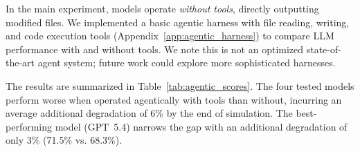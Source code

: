 \documentclass{article} %
\begin{document}
\begin{table}[t]
\vspace{-2\intextsep}
\begin{minipage}[t]{0.48\textwidth}
\vspace{0pt}
\centering

\caption{Tool-use effect on degradation for four LLMs, comparing agentic (\iconagentic) and direct (\icondirect) operation. All models degrade documents more with tools than without.}
\label{tab:agentic_scores}
\end{minipage}\hfill
\begin{minipage}[t]{0.48\textwidth}
\vspace{0pt}
\centering

\caption{Tool-use behavior. Tool use leads to overhead (with tools / no tools): models consume more input tokens (Inp$\times$), produce fewer output tokens (Out$\times$), cost more (\$$\times$), with typically higher latency (Lat$\times$). To edit documents, models can execute code (\iconexec) or write files manually (\iconwrite). \%Dist: the portion of distractor files read.}
\label{tab:agentic_behavior}
\end{minipage}
\vspace{-2\intextsep}
\end{table}

In the main experiment, models operate \textit{without tools}, directly outputting modified files. We implemented a basic agentic harness \cite{Yao2022ReActSR} with file reading, writing, and code execution tools (Appendix~\ref{app:agentic_harness}) to compare LLM performance with and without tools. We note this is not an optimized state-of-the-art agent system; future work could explore more sophisticated harnesses.

The results are summarized in Table~\ref{tab:agentic_scores}. The four tested models perform worse when operated agentically with tools than without, incurring an average additional degradation of 6\% by the end of simulation. The best-performing model (GPT~5.4) narrows the gap with an additional degradation of only 3\% (71.5\% vs. 68.3\%).
\end{document}
